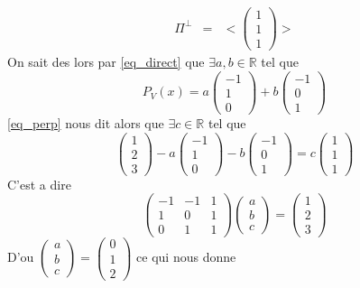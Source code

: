 \documentclass[11pt,a4paper]{article} %
\begin{document}
\begin{enumerate}
\begin{description}
\begin{eqnarray*}
					\Pi^{\perp} & = & <\begin{pmatrix}1\\1\\1\end{pmatrix}>
				\end{eqnarray*}
				On sait des lors par \eqref{eq_direct} que $\exists a, b \in \mathbb{R}$ tel que
				\[
					P_V(x) = a\begin{pmatrix}-1\\1\\0\end{pmatrix} + b\begin{pmatrix}-1\\0\\1\end{pmatrix}
				\]
				\eqref{eq_perp} nous dit alors que $\exists c \in \mathbb{R}$ tel que
				\[
					\begin{pmatrix}1\\2\\3\end{pmatrix} - a\begin{pmatrix}-1\\1\\0\end{pmatrix} - b\begin{pmatrix}-1\\0\\1\end{pmatrix}
					= c\begin{pmatrix}1\\1\\1\end{pmatrix}
				\]
				C'est a dire
				\[
					\begin{pmatrix}-1&-1&1\\1&0&1\\0&1&1\end{pmatrix}\begin{pmatrix}a\\b\\c\end{pmatrix}
					= \begin{pmatrix}1\\2\\3\end{pmatrix}
				\]
				D'ou $\begin{pmatrix}a\\b\\c\end{pmatrix} = \begin{pmatrix}0\\1\\2\end{pmatrix}$ ce qui nous donne

\end{description}
\end{enumerate}
\end{document}
